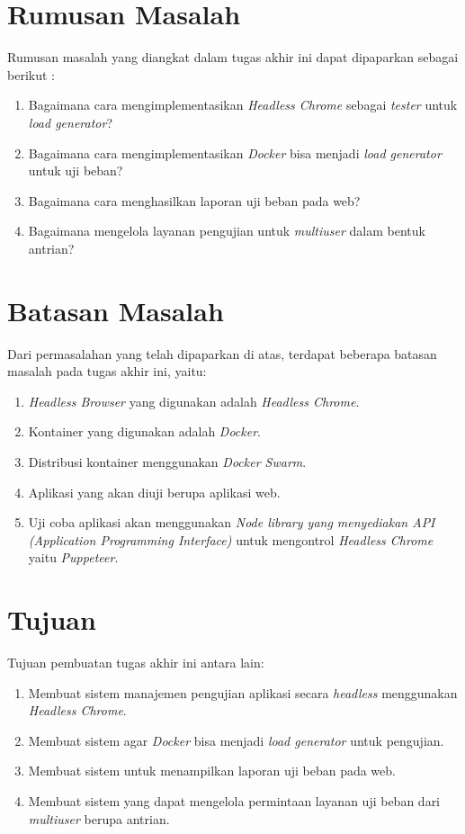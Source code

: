	\section{Rumusan Masalah}
       	Rumusan masalah yang diangkat dalam tugas akhir ini dapat dipaparkan sebagai berikut :
		\begin{enumerate}
			\item Bagaimana cara mengimplementasikan \textit{Headless Chrome} sebagai \textit{tester} untuk \textit{load generator}?
			\item Bagaimana cara mengimplementasikan \textit{Docker} bisa menjadi \textit{load generator} untuk uji beban?
			\item Bagaimana cara menghasilkan laporan uji beban pada web?
			\item Bagaimana mengelola layanan pengujian untuk \textit{multiuser} dalam bentuk antrian?
		\end{enumerate}

	\section{Batasan Masalah}
		Dari permasalahan yang telah dipaparkan di atas, terdapat beberapa batasan masalah pada tugas akhir ini, yaitu:
		\begin{enumerate}
			\item \textit{Headless Browser} yang digunakan adalah \textit{Headless Chrome}.
			\item Kontainer yang digunakan adalah \textit{Docker}.
			\item Distribusi kontainer menggunakan \textit{Docker Swarm}.
			\item Aplikasi yang akan diuji berupa aplikasi web.
			\item Uji coba aplikasi akan menggunakan  \textit{Node library yang menyediakan API (Application Programming Interface)} untuk mengontrol \textit{Headless Chrome} yaitu \textit{Puppeteer}.
		\end{enumerate}

	\section{Tujuan}
       	Tujuan pembuatan tugas akhir ini antara lain:
       	\begin{enumerate}
       		\item Membuat sistem manajemen pengujian aplikasi secara \textit{headless} menggunakan \textit{Headless Chrome}.
       		\item Membuat sistem agar \textit{Docker} bisa menjadi \textit{load generator} untuk pengujian.
       		\item Membuat sistem untuk menampilkan laporan uji beban pada web.
       		\item Membuat sistem yang dapat mengelola permintaan layanan uji beban dari \textit{multiuser} berupa antrian.
       	\end{enumerate}
        
